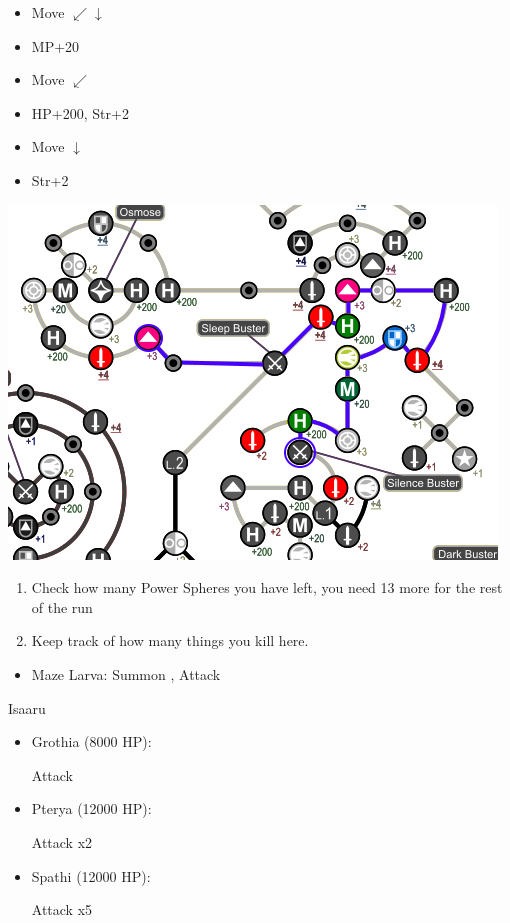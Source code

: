 \begin{spheregrid}
\begin{itemize}
\begin{itemize}
      \item Move $\swarrow\downarrow$
      \item MP+20
      \item Move $\swarrow$
      \item HP+200, Str+2
      \item Move $\downarrow$
      \item Str+2
    \end{itemize}
    \includegraphics[width=.8\columnwidth]{graphics/Yuna_Via_Purifico}
  \end{itemize}
\end{spheregrid}
\begin{enumerate}[resume]
  \item Check how many Power Spheres you have left, you need 13 more for the rest of the run
  \item Keep track of how many things you kill here.
\end{enumerate}
\begin{encounters}
  \begin{itemize}
    \item Maze Larva: Summon \ixilon, Attack
  \end{itemize}
\end{encounters}
\begin{battle}{Isaaru}
  \begin{itemize}
    \item Grothia (8000 HP):
          \begin{itemize}
            \summon{\bahamut}
            \bahamutf Attack
          \end{itemize}
    \item Pterya (12000 HP):
          \begin{itemize}
            \summon{\bahamut}
            \bahamutf Attack x2
          \end{itemize}
    \item Spathi (12000 HP):
          \begin{itemize}
            \summon{\ixilon}
            \ixilonf Attack x5
          \end{itemize}
  \end{itemize}
\end{battle}
